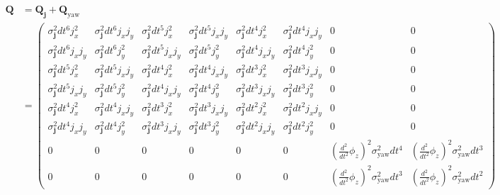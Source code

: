 \documentclass{article}
\begin{document}
\begin{align}
  \textbf{Q} &= \textbf{Q}_{\textbf{j}} + \textbf{Q}_{\textrm{yaw}} \\
&= \left(\begin{matrix}\sigma^2_\textbf{j} dt^{6} j_{x}^{2} & \sigma^2_\textbf{j} dt^{6} j_{x} j_{y} & \sigma^2_\textbf{j} dt^{5} j_{x}^{2} & \sigma^2_\textbf{j} dt^{5} j_{x} j_{y} & \sigma^2_\textbf{j} dt^{4} j_{x}^{2} & \sigma^2_\textbf{j} dt^{4} j_{x} j_{y} & 0 & 0\\\sigma^2_\textbf{j} dt^{6} j_{x} j_{y} & \sigma^2_\textbf{j} dt^{6} j_{y}^{2} & \sigma^2_\textbf{j} dt^{5} j_{x} j_{y} & \sigma^2_\textbf{j} dt^{5} j_{y}^{2} & \sigma^2_\textbf{j} dt^{4} j_{x} j_{y} & \sigma^2_\textbf{j} dt^{4} j_{y}^{2} & 0 & 0\\\sigma^2_\textbf{j} dt^{5} j_{x}^{2} & \sigma^2_\textbf{j} dt^{5} j_{x} j_{y} & \sigma^2_\textbf{j} dt^{4} j_{x}^{2} & \sigma^2_\textbf{j} dt^{4} j_{x} j_{y} & \sigma^2_\textbf{j} dt^{3} j_{x}^{2} & \sigma^2_\textbf{j} dt^{3} j_{x} j_{y} & 0 & 0\\\sigma^2_\textbf{j} dt^{5} j_{x} j_{y} & \sigma^2_\textbf{j} dt^{5} j_{y}^{2} & \sigma^2_\textbf{j} dt^{4} j_{x} j_{y} & \sigma^2_\textbf{j} dt^{4} j_{y}^{2} & \sigma^2_\textbf{j} dt^{3} j_{x} j_{y} & \sigma^2_\textbf{j} dt^{3} j_{y}^{2} & 0 & 0\\\sigma^2_\textbf{j} dt^{4} j_{x}^{2} & \sigma^2_\textbf{j} dt^{4} j_{x} j_{y} & \sigma^2_\textbf{j} dt^{3} j_{x}^{2} & \sigma^2_\textbf{j} dt^{3} j_{x} j_{y} & \sigma^2_\textbf{j} dt^{2} j_{x}^{2} & \sigma^2_\textbf{j} dt^{2} j_{x} j_{y} & 0 & 0\\\sigma^2_\textbf{j} dt^{4} j_{x} j_{y} & \sigma^2_\textbf{j} dt^{4} j_{y}^{2} & \sigma^2_\textbf{j} dt^{3} j_{x} j_{y} & \sigma^2_\textbf{j} dt^{3} j_{y}^{2} & \sigma^2_\textbf{j} dt^{2} j_{x} j_{y} & \sigma^2_\textbf{j} dt^{2} j_{y}^{2} & 0 & 0\\0 & 0 & 0 & 0 & 0 & 0 & \left(\frac{d^2}{dt^2}\phi_z\right)^{2} \sigma^2_{\textrm{yaw}} dt^{4} & \left(\frac{d^2}{dt^2}\phi_z\right)^{2} \sigma^2_{\textrm{yaw}} dt^{3}\\0 & 0 & 0 & 0 & 0 & 0 & \left(\frac{d^2}{dt^2}\phi_z\right)^{2} \sigma^2_{\textrm{yaw}} dt^{3} & \left(\frac{d^2}{dt^2}\phi_z\right)^{2} \sigma^2_{\textrm{yaw}} dt^{2}\end{matrix}\right)
\end{align}
\end{document}
